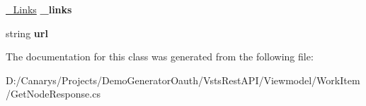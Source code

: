 \begin{DoxyCompactItemize}
\mbox{\hyperlink{class_vsts_rest_a_p_i_1_1_viewmodel_1_1_work_item_1_1_get_node_response_1_1___links}{\+\_\+\+Links}} {\bfseries \+\_\+links}
\item 
\mbox{\label{class_vsts_rest_a_p_i_1_1_viewmodel_1_1_work_item_1_1_get_node_response_1_1_node_ac120f23a4f8c6ae28a732ebbf2d6e008}} 
string {\bfseries url}
\end{DoxyCompactItemize}


The documentation for this class was generated from the following file\+:\begin{DoxyCompactItemize}
\item 
D\+:/\+Canarys/\+Projects/\+Demo\+Generator\+Oauth/\+Vsts\+Rest\+A\+P\+I/\+Viewmodel/\+Work\+Item/Get\+Node\+Response.\+cs\end{DoxyCompactItemize}
